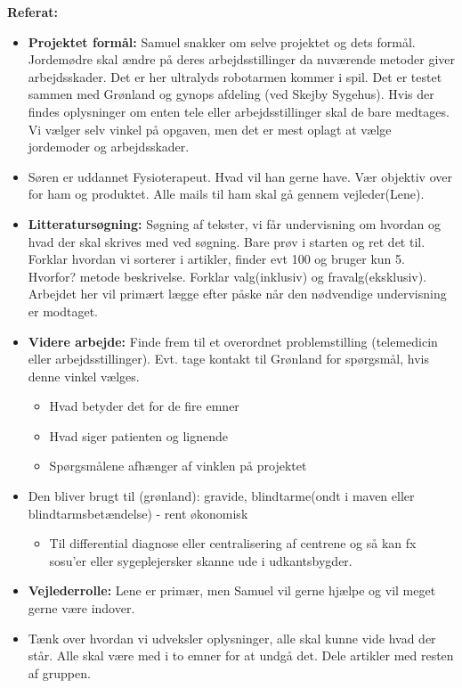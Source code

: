 \textbf{Referat:}
\begin{itemize}
	\item \textbf{Projektet formål:} Samuel snakker om selve projektet og dets formål. Jordemødre skal ændre på deres arbejdsstillinger da nuværende metoder giver arbejdsskader. Det er her ultralyds robotarmen kommer i spil.
	Det er testet sammen med Grønland og gynops afdeling (ved Skejby Sygehus). Hvis der findes oplysninger om enten tele eller arbejdsstillinger skal de bare medtages. Vi vælger selv vinkel på opgaven, men det er mest oplagt at vælge jordemoder og arbejdsskader.
	\item Søren er uddannet Fysioterapeut. Hvad vil han gerne have. Vær objektiv over for ham og produktet.  Alle mails til ham skal gå gennem vejleder(Lene). 
	\item \textbf{Litteratursøgning:} Søgning af tekster, vi får undervisning om hvordan og hvad der skal skrives med ved søgning. Bare prøv i starten og ret det til. 
	Forklar hvordan vi sorterer i artikler, finder evt 100 og bruger kun 5. Hvorfor? metode beskrivelse. Forklar valg(inklusiv) og fravalg(eksklusiv). Arbejdet her vil primært lægge efter påske når den nødvendige undervisning er modtaget.
	\item \textbf{Videre arbejde:} Finde frem til et overordnet problemstilling (telemedicin eller arbejdsstillinger). Evt. tage kontakt til Grønland for spørgsmål, hvis denne vinkel vælges. 
	\begin{itemize}
		\item Hvad betyder det for de fire emner
		\item Hvad siger patienten og lignende 
		\item Spørgsmålene afhænger af vinklen på projektet
	\end{itemize}   
	\item Den bliver brugt til (grønland): gravide, blindtarme(ondt i maven eller blindtarmsbetændelse) - rent økonomisk 
	\begin{itemize}
		\item Til differential diagnose eller centralisering af centrene og så kan fx sosu'er eller sygeplejersker skanne ude i udkantsbygder.
	\end{itemize} 
	\item \textbf{Vejlederrolle:} Lene er primær, men Samuel vil gerne hjælpe og vil meget gerne være indover. 
	\item Tænk over hvordan vi udveksler oplysninger,  alle skal kunne vide hvad der står. Alle skal være med i to emner for at undgå det. Dele artikler med resten af gruppen. 

\end{itemize}
